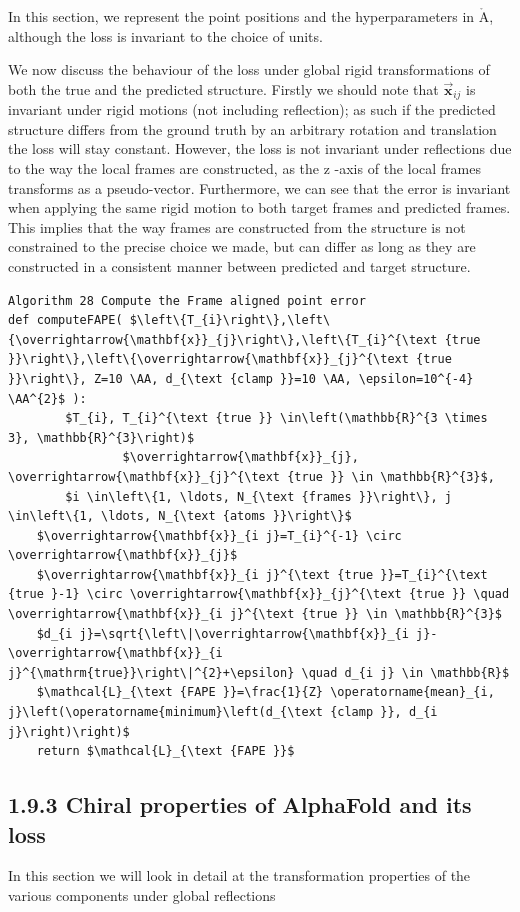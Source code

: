 \documentclass[10pt]{article}
\def\AA{\mathring{\mathrm{A}}}
\begin{document}
In this section, we represent the point positions and the hyperparameters in $\AA$, although the loss is invariant to the choice of units.

We now discuss the behaviour of the loss under global rigid transformations of both the true and the predicted structure. Firstly we should note that $\overrightarrow{\mathbf{x}}_{i j}$ is invariant under rigid motions (not including reflection); as such if the predicted structure differs from the ground truth by an arbitrary rotation and translation the loss will stay constant. However, the loss is not invariant under reflections due to the way the local frames are constructed, as the z -axis of the local frames transforms as a pseudo-vector. Furthermore, we can see that the error is invariant when applying the same rigid motion to both target frames and predicted frames. This implies that the way frames are constructed from the structure is not constrained to the precise choice we made, but can differ as long as they are constructed in a consistent manner between predicted and target structure.

\begin{verbatim}
Algorithm 28 Compute the Frame aligned point error
def computeFAPE( $\left\{T_{i}\right\},\left\{\overrightarrow{\mathbf{x}}_{j}\right\},\left\{T_{i}^{\text {true }}\right\},\left\{\overrightarrow{\mathbf{x}}_{j}^{\text {true }}\right\}, Z=10 \AA, d_{\text {clamp }}=10 \AA, \epsilon=10^{-4} \AA^{2}$ ):
        $T_{i}, T_{i}^{\text {true }} \in\left(\mathbb{R}^{3 \times 3}, \mathbb{R}^{3}\right)$
                $\overrightarrow{\mathbf{x}}_{j}, \overrightarrow{\mathbf{x}}_{j}^{\text {true }} \in \mathbb{R}^{3}$,
        $i \in\left\{1, \ldots, N_{\text {frames }}\right\}, j \in\left\{1, \ldots, N_{\text {atoms }}\right\}$
    $\overrightarrow{\mathbf{x}}_{i j}=T_{i}^{-1} \circ \overrightarrow{\mathbf{x}}_{j}$
    $\overrightarrow{\mathbf{x}}_{i j}^{\text {true }}=T_{i}^{\text {true }-1} \circ \overrightarrow{\mathbf{x}}_{j}^{\text {true }} \quad \overrightarrow{\mathbf{x}}_{i j}^{\text {true }} \in \mathbb{R}^{3}$
    $d_{i j}=\sqrt{\left\|\overrightarrow{\mathbf{x}}_{i j}-\overrightarrow{\mathbf{x}}_{i j}^{\mathrm{true}}\right\|^{2}+\epsilon} \quad d_{i j} \in \mathbb{R}$
    $\mathcal{L}_{\text {FAPE }}=\frac{1}{Z} \operatorname{mean}_{i, j}\left(\operatorname{minimum}\left(d_{\text {clamp }}, d_{i j}\right)\right)$
    return $\mathcal{L}_{\text {FAPE }}$
\end{verbatim}

\subsection*{1.9.3 Chiral properties of AlphaFold and its loss}
In this section we will look in detail at the transformation properties of the various components under global reflections
\end{document}
